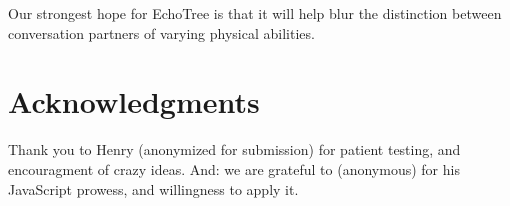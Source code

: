 \documentclass{sigchi}
\begin{document}
Our strongest hope for EchoTree is that it will help blur the
distinction between conversation partners of varying physical
abilities. 

\section{Acknowledgments}
Thank you to Henry (anonymized for submission) for patient testing,
and encouragment of crazy ideas. And: we are grateful to (anonymous)
for his JavaScript prowess, and willingness to apply it.


%
%
%
%
%
\balance


\scriptsize{}
\end{document}
